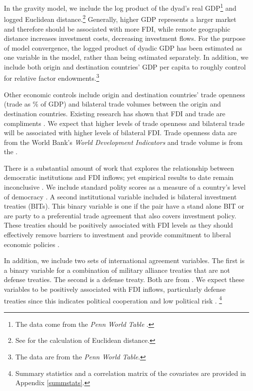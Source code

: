 \documentclass[reqno,onecolumn,letterpaper,12pt]{article}
\begin{document}
In the gravity model, we include the log product of the dyad's real GDP\footnote{The data come from the \textit{Penn World Table}  \citep{feenstra2015next}.} and logged Euclidean distance.\footnote{See \citet{mayer2011notes} for the calculation of Euclidean distance.} Generally, higher GDP represents a larger market and therefore should be associated with more FDI, while remote geographic distance increases investment costs, decreasing investment flows. For the purpose of model convergence, the logged product of dyadic GDP has been estimated as one variable in the model, rather than being estimated separately. In addition, we include both origin and destination countries' GDP per capita to roughly control for relative factor endowments.\footnote{The data are from the \textit{Penn World Table}.}

Other economic controls include origin and destination countries' trade openness (trade as \% of GDP) and bilateral trade volumes between the origin and destination countries. Existing research has shown that FDI and trade are compliments \citep{aizenman2006fdi,Markusen:1995}. We expect that higher levels of trade openness and bilateral trade will be associated with higher levels of bilateral FDI. Trade openness data are from the World Bank's \textit{World Development Indicators} and trade volume is from the \citet{OECD}.

There is a substantial amount of work that explores the relationship between democratic institutions and FDI inflows; yet empirical results to date remain inconclusive \citep[see,~e.g.,][]{Jensen:2003,Li_Resnick:2003,Jakobsen_DeSoysa:2006,Resnick:2001,Li_et_al:2016}. We include standard polity scores as a measure of a country's level of democracy \citep{Marshall_Jaggers:2010}. A second institutional variable included is bilateral investment treaties (BITs). This binary variable is one if the pair have a stand alone BIT or are party to a preferential trade agreement that also covers investment policy. These treaties should be positively associated with FDI levels as they should effectively remove barriers to investment and provide commitment to liberal economic policies \citep{Kerner:2009,Buthe_Milner:2008,Allee_Peinhardt:2011}. %

In addition, we include two sets of international agreement variables. The first is a binary variable for a combination of military alliance treaties that are not defense treaties. The second is a defense treaty. Both are from \citet{Gibler09}. We expect these variables to be positively associated with FDI inflows, particularly defense treaties since this indicates political cooperation and low political risk \citep{Li_Vashchilko:2010}. \footnote{Summary statistics and a correlation matrix of the covariates are provided in Appendix \ref{summstats}.}
\end{document}
